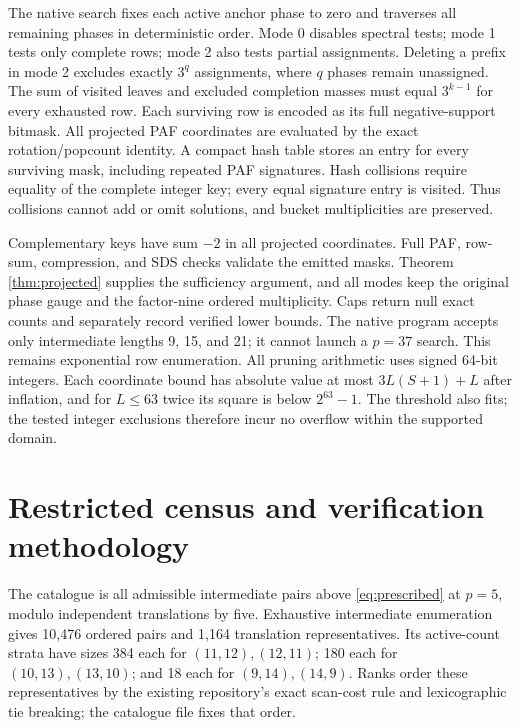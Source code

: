 \documentclass[11pt]{article}
\begin{document}
The native search fixes each active anchor phase to zero and traverses all
remaining phases in deterministic order. Mode 0 disables spectral tests;
mode 1 tests only complete rows; mode 2 also tests partial assignments.
Deleting a prefix in mode 2 excludes exactly $3^q$ assignments, where $q$
phases remain unassigned. The sum of visited leaves and excluded completion
masses must equal $3^{k-1}$ for every exhausted row. Each surviving row is
encoded as its full negative-support bitmask. All projected PAF coordinates
are evaluated by the exact rotation/popcount identity. A compact hash table
stores an entry for every surviving mask, including repeated PAF signatures.
Hash collisions require equality of the complete integer key; every equal
signature entry is visited. Thus collisions cannot add or omit solutions,
and bucket multiplicities are preserved.

Complementary keys have sum $-2$ in all projected coordinates. Full PAF,
row-sum, compression, and SDS checks validate the emitted masks. Theorem
\ref{thm:projected} supplies the sufficiency argument, and all modes keep
the original phase gauge and the factor-nine ordered multiplicity. Caps
return null exact counts and separately record verified lower bounds.
The native program accepts only intermediate lengths 9, 15, and 21; it
cannot launch a $p=37$ search. This remains exponential row enumeration.
All pruning arithmetic uses signed 64-bit integers. Each coordinate bound
has absolute value at most $3L(S+1)+L$ after inflation, and for $L\le63$
twice its square is below $2^{63}-1$. The threshold also fits; the tested
integer exclusions therefore incur no overflow within the supported domain.

\section{Restricted census and verification methodology}
The catalogue is all admissible intermediate pairs above \eqref{eq:prescribed}
at $p=5$, modulo independent translations by five. Exhaustive intermediate
enumeration gives 10,476 ordered pairs and 1,164 translation representatives.
Its active-count strata have sizes 384 each for $(11,12),(12,11)$; 180 each
for $(10,13),(13,10)$; and 18 each for $(9,14),(14,9)$.
Ranks order these representatives by the existing repository's exact scan-cost
rule and lexicographic tie breaking; the catalogue file fixes that order.
\end{document}
